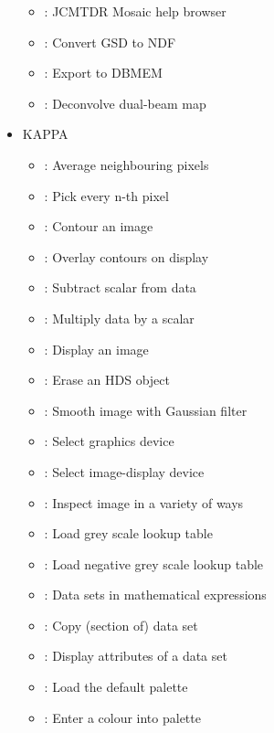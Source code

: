 \begin{itemize}
\begin{itemize}
   \item {}: JCMTDR Mosaic help browser
   \item {}: Convert GSD to NDF
   \item {}: Export to DBMEM
   \item {}: Deconvolve dual-beam map
   \end{itemize}
\item KAPPA 
   \begin{itemize}
   \item {}: Average neighbouring pixels
   \item {}: Pick every n-th pixel
   \item {}: Contour an image
   \item {}: Overlay contours on display
   \item {}: Subtract scalar from data
   \item {}: Multiply data by a scalar
   \item {}: Display an image
   \item {}: Erase an HDS object
   \item {}: Smooth image with Gaussian filter
   \item {}: Select graphics device
   \item {}: Select image-display device
   \item {}: Inspect image in a variety of ways
   \item {}: Load grey scale lookup table
   \item {}: Load negative grey scale lookup table
   \item {}: Data sets in mathematical expressions
   \item {}: Copy (section of) data set
   \item {}: Display attributes of a data set
   \item {}: Load the default palette
   \item {}: Enter a colour into palette

\end{itemize}
\end{itemize}
